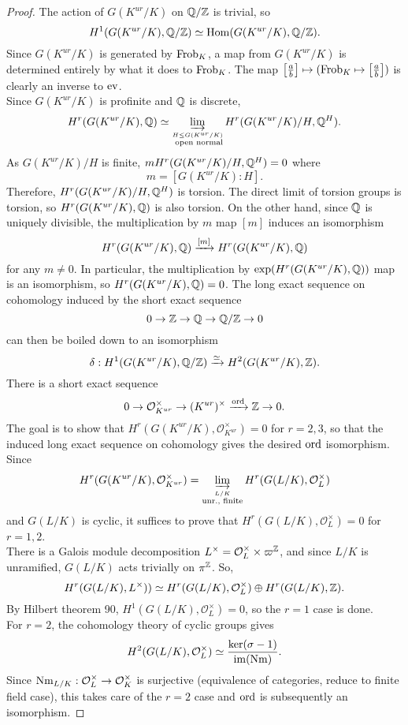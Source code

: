 \documentclass[class=article, crop=false]{standalone}
\begin{document}
\begin{proof}
	The action of $G(K^{ur}/K)$ on $\mathbb{Q}/\mathbb{Z}$ is trivial, so
	\[
	H^{1}(G(K^{ur}/K),\mathbb{Q}/\mathbb{Z})\simeq\operatorname{Hom}(G(K^{ur}/K),\mathbb{Q}/\mathbb{Z})
	.\] 
	Since $G(K^{ur}/K)$ is generated by $\operatorname{Frob}_K$, a map from $G(K^{ur}/K)$ is determined entirely by what it does to $\operatorname{Frob}_K$. The map $\left[\frac{a}{b}\right]\mapsto(\operatorname{Frob}_K\mapsto\left[\frac{a}{b}\right])$ is clearly an inverse to $\operatorname{ev}$.\\
	Since $G(K^{ur}/K)$ is profinite and $\mathbb{Q}$ is discrete,
	\[
		H^{r}(G(K^{ur}/K),\mathbb{Q})\simeq\varinjlim_{\stackrel{H\le G(K^{ur}/K)}{\text{ open normal}}}H^{r}(G(K^{ur}/K)/H,\mathbb{Q}^{H})
	.\] 
	As $G(K^{ur}/K)/H$ is finite, $mH^{r}(G(K^{ur}/K)/H,\mathbb{Q}^{H})=0$ where
	\[
	m=[G(K^{ur}/K):H]
	.\] 
	Therefore, $H^{r}(G(K^{ur}/K)/H,\mathbb{Q}^{H})$ is torsion. The direct limit of torsion groups is torsion, so $H^{r}(G(K^{ur}/K),\mathbb{Q})$ is also torsion. On the other hand, since $\mathbb{Q}$ is uniquely divisible, the multiplication by $m$ map $[m]$ induces an isomorphism
	\[
		H^{r}(G(K^{ur}/K),\mathbb{Q})\xrightarrow{[m]}H^{r}(G(K^{ur}/K),\mathbb{Q})
	\] 
	for any $m\ne 0$. In particular, the multiplication by $\exp(H^{r}(G(K^{ur}/K),\mathbb{Q}))$  map is an isomorphism, so $H^{r}(G(K^{ur}/K),\mathbb{Q})=0$. The long exact sequence on cohomology induced by the short exact sequence
	\[
		0\to\mathbb{Z}\to\mathbb{Q}\to\mathbb{Q}/\mathbb{Z}\to 0
	\] 
	can then be boiled down to an isomorphism
	\[
		\delta:H^{1}(G(K^{ur}/K),\mathbb{Q}/\mathbb{Z})\xrightarrow{\simeq}H^{2}(G(K^{ur}/K),\mathbb{Z})
	.\] 
	There is a short exact sequence
	\[
		0\to\mathcal{O}_{K^{ur}}^{\times}\to(K^{ur})^{\times}\xrightarrow{\operatorname{ord}}\mathbb{Z}\to 0
	.\] 
	The goal is to show that $H^{r}(G(K^{ur}/K),\mathcal{O}_{K^{ur}}^{\times})=0$ for $r=2,3$, so that the induced long exact sequence on cohomology gives the desired $\operatorname{ord}$ isomorphism. Since
	\[
		H^{r}(G(K^{ur}/K),\mathcal{O}_{K^{ur}}^{\times})=\varinjlim_{\stackrel{L/K}{\text{unr., finite}}}H^{r}(G(L/K),\mathcal{O}_L^{\times})
	\] 
	and $G(L/K)$ is cyclic, it suffices to prove that $H^{r}(G(L/K),\mathcal{O}_L^{\times})=0$ for $r=1,2$.\\
	There is a Galois module decomposition $L^{\times}=\mathcal{O}_L^{\times}\times\varpi^{\mathbb{Z}}$, and since $L/K$ is unramified, $G(L/K)$ acts trivially on $\pi^{\mathbb{Z}}$. So,
	\[
		H^{r}(G(L/K),L^{\times}))\simeq H^{r}(G(L/K),\mathcal{O}_L^{\times})\oplus H^{r}(G(L/K),\mathbb{Z})
	.\] 
	By Hilbert theorem 90, $H^{1}(G(L/K),\mathcal{O}_L^{\times})=0$, so the $r=1$ case is done.\\
	For $r=2$, the cohomology theory of cyclic groups gives
	\[
		H^{2}(G(L/K),\mathcal{O}_L^{\times})\simeq\frac{\ker(\sigma-1)}{\mathrm{im}(\mathrm{Nm})}
	.\] 
	Since $\mathrm{Nm}_{L/K}:\mathcal{O}_L^{\times}\to\mathcal{O}_K^{\times}$ is surjective (equivalence of categories, reduce to finite field case), this takes care of the $r=2$ case and $\operatorname{ord}$ is subsequently an isomorphism.
\end{proof}
\end{document}
